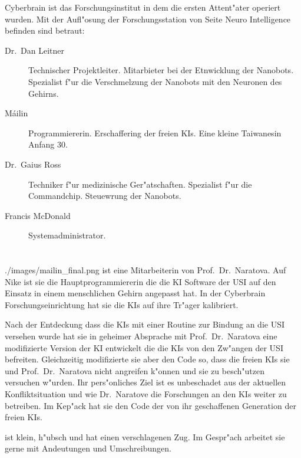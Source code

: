 
Cyberbrain ist das Forschungsinstitut in dem die ersten Attent"ater operiert wurden. Mit der Aufl"osung der Forschungsstation von Seite Neuro Intelligence befinden sind betraut:

\begin{description}
    \item[Dr.~Dan Leitner] Technischer Projektleiter. Mitarbieter bei der Etnwicklung der Nanobots. Spezialist f"ur die Verschmelzung 
        der  Nanobots mit den Neuronen des Gehirns.
    \item[M\'{a}ilin] Programmiererin. Erschaffering der freien KIs. Eine kleine Taiwanesin Anfang 30. 
    \item[Dr.~Gaius Ross] Techniker f"ur medizinische Ger"atschaften. Spezialist f"ur die Commandchip. Steuewrung der Nanobots.
    \item[Francis McDonald] Systemadministrator.
\end{description}

\section[Mailin]{\ml{}}

\begin{sideimagebox}[r]{0.6}{./images/mailin_final.png}{\ml}
    \ml{} ist eine Mitarbeiterin von Prof.~Dr.~Naratova. Auf Nike ist sie die Hauptprogrammiererin die die KI Software der USI auf den Einsatz in einem menschlichen Gehirn angepasst hat.  In der Cyberbrain Forschungseinrichtung hat sie die KIs auf ihre Tr"ager kalibriert.

    Nach der Entdeckung dass die KIs mit einer Routine zur Bindung an die USI versehen wurde hat sie in geheimer Absprache mit Prof.~Dr.~Naratova eine modifizierte Version der KI entwickelt die die KIs von den Zw"angen der USI befreiten. Gleichzeitig modifizierte sie aber den Code so, dass die freien KIs sie und Prof.~Dr.~Naratova nicht angreifen k"onnen und sie zu besch"utzen versuchen w"urden. Ihr pers"onliches Ziel ist es unbeschadet aus der aktuellen Konfliktsituation und wie Dr.~Naratove die Forschungen an den KIs weiter zu betreiben. Im Kep"ack hat sie den Code der von ihr geschaffenen Generation der freien KIs.

    \ml{} ist klein, h"ubsch und hat einen verschlagenen Zug. Im Gespr"ach arbeitet sie gerne mit Andeutungen und Umschreibungen.
\end{sideimagebox}

